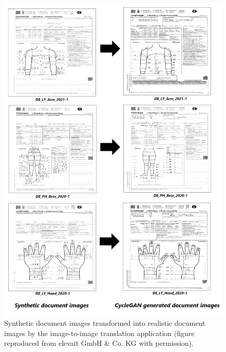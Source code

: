 \begin{figure}[H]
        \begin{center}
	    \includegraphics[scale=0.33]{images/Evaluation/Qualitative_Results.png}
	    \caption[Synthetic document images are transformed into realistic document images by the proposed image-to-image translation application.]{Synthetic document images transformed into realistic document images by the image-to-image translation application (figure reproduced from elevait GmbH \& Co. KG with permission).}
	    \label{fig:QualitativeResults}
	    \end{center}
\end{figure}

